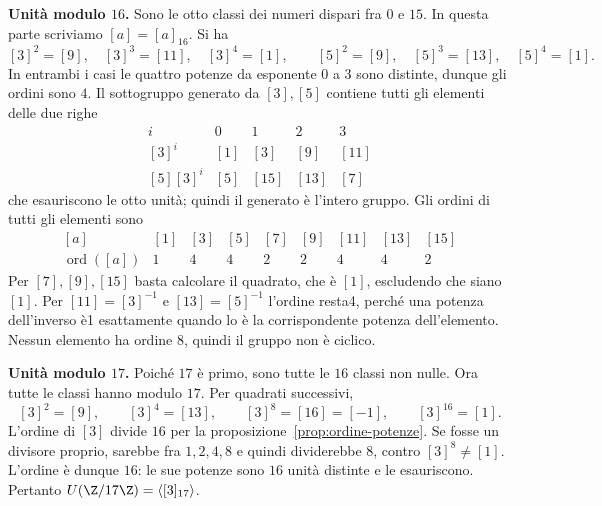 \begin{svolgimento}
\textbf{Unità modulo $16$.} Sono le otto classi dei numeri dispari fra $0$ e $15$. In questa parte scriviamo $[a]=[a]_{16}$. Si ha
\[
[3]^2=[9],\quad[3]^3=[11],\quad[3]^4=[1],\qquad
[5]^2=[9],\quad[5]^3=[13],\quad[5]^4=[1].
\]
In entrambi i casi le quattro potenze da esponente $0$ a $3$ sono distinte, dunque gli ordini sono $4$. Il sottogruppo generato da $[3],[5]$ contiene tutti gli elementi delle due righe
\[
\begin{array}{c|rrrr}
i&0&1&2&3\\\hline
[3]^i &[1]&[3]&[9]&[11]\\
{[5][3]^i} &[5]&[15]&[13]&[7]
\end{array}
\]
che esauriscono le otto unità; quindi il generato è l'intero gruppo. Gli ordini di tutti gli elementi sono
\[
\begin{array}{c|rrrrrrrr}
[a]&[1]&[3]&[5]&[7]&[9]&[11]&[13]&[15]\\\hline
\operatorname{ord}([a])&1&4&4&2&2&4&4&2
\end{array}
\]
Per $[7],[9],[15]$ basta calcolare il quadrato, che è $[1]$, escludendo che siano $[1]$. Per $[11]=[3]^{-1}$ e $[13]=[5]^{-1}$ l'ordine resta4, perché una potenza dell'inverso è1 esattamente quando lo è la corrispondente potenza dell'elemento. Nessun elemento ha ordine $8$, quindi il gruppo non è ciclico.

\textbf{Unità modulo $17$.} Poiché $17$ è primo, sono tutte le $16$ classi non nulle. Ora tutte le classi hanno modulo $17$. Per quadrati successivi,
\[
[3]^2=[9],\qquad[3]^4=[13],\qquad[3]^8=[16]=[-1],\qquad[3]^{16}=[1].
\]
L'ordine di $[3]$ divide $16$ per la proposizione~\ref{prop:ordine-potenze}. Se fosse un divisore proprio, sarebbe fra $1,2,4,8$ e quindi dividerebbe $8$, contro $[3]^8\ne[1]$. L'ordine è dunque $16$: le sue potenze sono $16$ unità distinte e le esauriscono. Pertanto $U(\Z/17\Z)=\langle[3]_{17}\rangle$.
\end{svolgimento}
